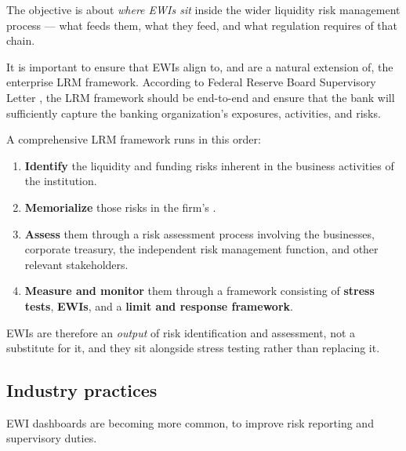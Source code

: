 \gapbadge
{}

\begin{lrgapbox}
The objective is about \emph{where EWIs sit} inside the wider liquidity risk management process — what feeds them, what they feed, and what regulation requires of that chain.
\end{lrgapbox}

It is important to ensure that EWIs align to, and are a natural extension of, the enterprise LRM framework. According to Federal Reserve Board Supervisory Letter , the LRM framework should be end-to-end and ensure that the bank will sufficiently capture the banking organization's exposures, activities, and risks.

\begin{lrkeybox}
A comprehensive LRM framework runs in this order:
\begin{enumerate}
\item \textbf{Identify} the liquidity and funding risks inherent in the business activities of the institution.
\item \textbf{Memorialize} those risks in the firm's .
\item \textbf{Assess} them through a risk assessment process involving the businesses, corporate treasury, the independent risk management function, and other relevant stakeholders.
\item \textbf{Measure and monitor} them through a framework consisting of \textbf{stress tests}, \textbf{EWIs}, and a \textbf{limit and response framework}.
\end{enumerate}
EWIs are therefore an \emph{output} of risk identification and assessment, not a substitute for it, and they sit alongside stress testing rather than replacing it.
\end{lrkeybox}

\subsection{Industry practices}

EWI dashboards are becoming more common, to improve risk reporting and supervisory duties.

